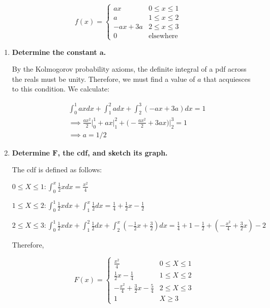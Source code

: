 \documentclass[10pt, oneside]{article}   	%
\theoremstyle{definition}
\begin{document}
\begin{enumerate}[label=4.\arabic*]
\[ f(x) = \begin{cases}
  ax  & 0 \leq x \leq 1 \\
  a & 1 \leq x \leq 2 \\
  -ax + 3a & 2 \leq x \leq 3 \\
  0 & \text{elsewhere}
\end{cases} \]

	\begin{enumerate}
	\item  \begin{tcolorbox}[
	  colback=Cerulean!5!white,
	  colframe=Cerulean!75!black]
	\textbf{Determine the constant $\bm{a}$.}
	\end{tcolorbox}
	
	By the Kolmogorov probability axioms, the definite integral of a pdf across the reals must be unity. Therefore, we must find a value of $a$ that acquiesces to this condition. We calculate:
	
	\begin{align*}
	&\int^1_0 ax dx + \int^2_1 adx + \int^3_2 (-ax + 3a)dx = 1 \\
	&\implies \frac{ax^2}{2} \Big|^1_0 + ax \Big|^2_1 + \Big( -\frac{ax^2}{2} + 3ax \Big) \Big|^3_2 = 1 \\
	&\implies \boxed{a = 1/2}
	\end{align*}
	
	\item  \begin{tcolorbox}[
	  colback=Cerulean!5!white,
	  colframe=Cerulean!75!black]
	\textbf{Determine $\bm{F}$, the cdf, and sketch its graph.}
	\end{tcolorbox}
	
	The cdf is defined as follows:
	
	$0 \leq X \leq 1: \int^x_0 \frac{1}{2}x dx = \frac{x^2}{4}$
	
	$1 \leq X \leq 2: \int^1_0 \frac{1}{2}x dx + \int^x_1 \frac{1}{2} dx = \frac{1}{4} + \frac{1}{2}x - \frac{1}{2}$
	
	$2 \leq X \leq 3: \int^1_0 \frac{1}{2}x dx + \int^2_1 \frac{1}{2} dx + \int^x_2 (-\frac{1}{2} x + \frac{3}{2} ) dx = \frac{1}{4} + 1 - \frac{1}{2} + ( -\frac{x^2}{4} + \frac{3}{2}x ) - 2$
	
	Therefore,
	
	\[ F(x) = \begin{cases}
  \frac{x^2}{4}  & 0 \leq X \leq 1 \\
  \frac{1}{2}x - \frac{1}{4} & 1 \leq X \leq 2 \\
  -\frac{x^2}{4} + \frac{3}{2}x - \frac{5}{4} & 2 \leq X \leq 3 \\
  1 & X \geq 3
\end{cases} \]


\end{enumerate}
\end{enumerate}
\end{document}
